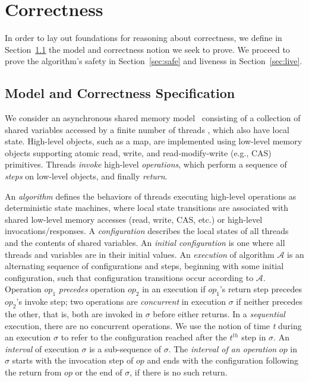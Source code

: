 \newcommand{\lp}[1]{LP(\ensuremath{#1})}

\section{Correctness}
\label{sec:proof}

In order to lay out foundations  for reasoning about correctness,  we  define in Section~\ref{sec:spec} the model and correctness notion we seek to prove. 
We proceed to prove the algorithm's safety in Section~\ref{sec:safe} and liveness in Section~\ref{sec:live}.

\subsection{Model and Correctness Specification}
\label{sec:spec}

We consider an asynchronous shared memory model~\cite{Welch2004} consisting of a collection of shared variables accessed by a finite number of threads , which also have local state.
High-level objects, such as a map, are implemented using low-level memory objects supporting atomic read, write, and read-modify-write (e.g., CAS) primitives. 
Threads  \emph{invoke} high-level \emph{operations}, which perform a sequence of  \emph{steps} on low-level objects, and finally \emph{return}.

An \emph{algorithm} defines the behaviors of threads executing high-level operations as deterministic state machines, where local state transitions are associated with  shared low-level memory 
accesses (read, write, CAS, etc.) or high-level invocations/responses.
A \emph{configuration} describes the  local states of all threads and the contents of shared variables. An \emph{initial configuration} is one where all threads and variables  are in their initial values.
An \emph{execution} of algorithm $\mathcal{A}$ is an alternating sequence of configurations and steps, beginning with some initial configuration, 
such that configuration transitions occur according to $\mathcal{A}$.
Operation $op_1$ \emph{precedes} operation $op_2$ in an execution if $op_1$'s return step precedes $op_2$'s invoke step;
two operations are \emph{concurrent} in execution $\sigma$  if neither precedes the other, that is, both are invoked in $\sigma$  before either returns.
 In a  \emph{sequential} execution, there are no concurrent operations.
We use the notion of time \emph{t} during an execution $\sigma$  to refer to the configuration reached after the $t^{th}$ step in $\sigma$.
An \emph{interval} of execution $\sigma$ is a sub-sequence of $\sigma$.
The \emph{interval of an operation} $op$ in $\sigma$  starts with the invocation step of $op$ and ends with the configuration following the return from $op$ or 
the end of $\sigma$, if there is no such return.


